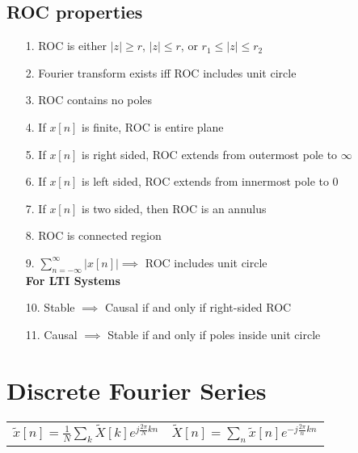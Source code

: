 \documentclass{article}
\begin{document}
\subsection*{ROC properties}
\begin{itemize}
    \item[1.] ROC is either $|z|\ge r$, $|z|\le r$, or $r_1 \le |z| \le r_2$
    \item[2.] Fourier transform exists iff ROC includes unit circle
    \item[3.] ROC contains no poles
    \item[4.] If $x[n]$ is finite, ROC is entire plane
    \item[5.] If $x[n]$ is right sided, ROC extends from outermost pole to $\infty$
    \item[6.] If $x[n]$ is left sided, ROC extends from innermost pole to 0
    \item[7.] If $x[n]$ is two sided, then ROC is an annulus
    \item[8.] ROC is connected region
    \item[9.] $\sum_{n=-\infty}^{\infty}|x[n]| \implies$ ROC includes unit circle \\
    \textbf{For LTI Systems}
    \item[10.] Stable $\implies$ Causal if and only if right-sided ROC
    \item[11.] Causal $\implies$ Stable if and only if poles inside unit circle
\end{itemize}
\pagebreak
\section*{Discrete Fourier Series}
\begin{center}
    \begin{tabularx}{\textwidth - 1in}{XX}
        $\tilde{x}[n] = \frac{1}{N}\sum_k\tilde{X}[k]e^{j\frac{2\pi}{N}kn}$ & $\tilde{X}[n] = \sum_{n}{\tilde{x}[n]e^{-j\frac{2\pi}{n}kn}}$
    \end{tabularx}
\end{center}
\end{document}
